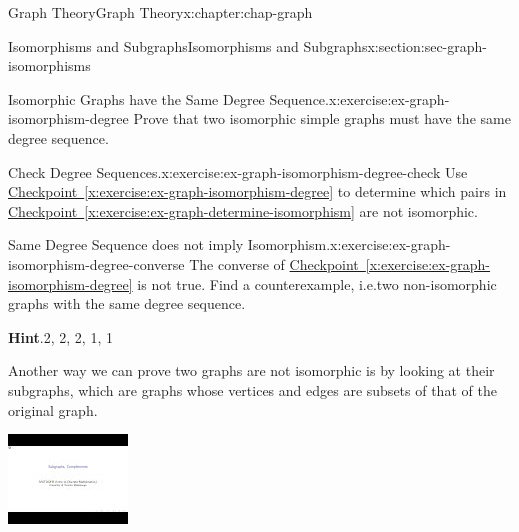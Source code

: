 \documentclass[oneside,10pt,]{book}
\newcommand{\blocktitlefont}{\relax}
\newcommand{\xreffont}{\relax}
\numberwithin{equation}{section}
\newlength{\qrsize}
\newlength{\previewwidth}
\begin{document}
\begin{chapterptx}{Graph Theory}{}{Graph Theory}{}{}{x:chapter:chap-graph}
\begin{sectionptx}{Isomorphisms and Subgraphs}{}{Isomorphisms and Subgraphs}{}{}{x:section:sec-graph-isomorphisms}
\begin{inlineexercise}{Isomorphic Graphs have the Same Degree Sequence.}{x:exercise:ex-graph-isomorphism-degree}
Prove that two isomorphic simple graphs must have the same degree sequence.%
\end{inlineexercise}%
\begin{inlineexercise}{Check Degree Sequences.}{x:exercise:ex-graph-isomorphism-degree-check}%
Use \hyperref[x:exercise:ex-graph-isomorphism-degree]{Checkpoint~{\xreffont\ref{x:exercise:ex-graph-isomorphism-degree}}} to determine which pairs in \hyperref[x:exercise:ex-graph-determine-isomorphism]{Checkpoint~{\xreffont\ref{x:exercise:ex-graph-determine-isomorphism}}} are not isomorphic.%
\end{inlineexercise}%
\begin{inlineexercise}{Same Degree Sequence does not imply Isomorphism.}{x:exercise:ex-graph-isomorphism-degree-converse}%
The converse of \hyperref[x:exercise:ex-graph-isomorphism-degree]{Checkpoint~{\xreffont\ref{x:exercise:ex-graph-isomorphism-degree}}} is not true. Find a counterexample, i.e.\@ two non-isomorphic graphs with the same degree sequence.%
\par\smallskip%
\noindent\textbf{\blocktitlefont Hint}.\hypertarget{g:hint:id543521}{}\quad{}2, 2, 2, 1, 1%
\end{inlineexercise}%
Another way we can prove two graphs are not isomorphic is by looking at their subgraphs, which are graphs whose vertices and edges are subsets of that of the original graph.%
\begin{sidebyside}{1}{0}{0}{0}%
\begin{sbspanel}{1}%
\setlength{\qrsize}{9em}
\setlength{\previewwidth}{\linewidth}
\addtolength{\previewwidth}{-\qrsize}
\begin{tcbraster}[raster columns=2, raster column skip=1pt, raster halign=center, raster force size=false, raster left skip=0pt, raster right skip=0pt]%
\begin{tcolorbox}[previewstyle, width=\previewwidth]%
\includegraphics[width=0.80\linewidth,height=\qrsize,keepaspectratio]{images/video-subgraphs.jpg}%

\end{tcolorbox}
\end{tcbraster}
\end{sbspanel}
\end{sidebyside}
\end{sectionptx}
\end{chapterptx}
\end{document}
